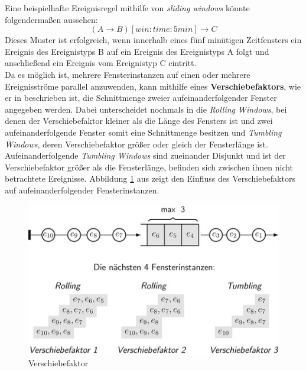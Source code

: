 \documentclass{acm_proc_article-sp}
\begin{document}
Eine beispielhafte Ereignisregel mithilfe von \textit{sliding windows} könnte 
folgendermaßen 
aussehen:
$$(A \rightarrow B)[win:time:5min] \rightarrow C$$
Dieses Muster ist erfolgreich, wenn innerhalb eines fünf minütigen Zeitfensters ein 
Ereignis des Ereignistyps B auf ein Ereignis des Ereignistyps A folgt und anschließend 
ein Ereignis vom Ereignistyp C eintritt.\\
Da es möglich ist, mehrere Fensterinstanzen auf einen oder mehrere Ereignisströme 
parallel 
anzuwenden, kann mithilfe eines \textbf{Verschiebefaktors}\label{kap:verschiebefaktor}, 
wie er in \cite{hedtstuck} beschrieben 
ist, die Schnittmenge zweier aufeinanderfolgender Fenster angegeben werden. Dabei 
unterscheidet \cite{hedtstuck} nochmals in die \textit{Rolling Windows}, bei denen der 
Verschiebefaktor kleiner als die Länge des Fensters ist und zwei aufeinanderfolgende 
Fenster somit eine Schnittmenge besitzen und \textit{Tumbling Windows}, deren 
Verschiebefaktor größer oder gleich der Fensterlänge ist. Aufeinanderfolgende 
\textit{Tumbling Windows} sind zueinander Disjunkt und ist der Verschiebefaktor größer 
als die Fensterlänge, befinden sich zwischen ihnen nicht betrachtete Ereignisse. 
Abbildung \ref{img:factors} aus \cite{hedtstuck} zeigt den Einfluss des 
Verschiebefaktors auf aufeinanderfolgender Fensterinstanzen.

\begin{figure}[H]
    \centering
    \includegraphics[width=\linewidth]{img/factor-hedstuck}
    \caption{Verschiebefaktor}
    \label{img:factors}
\end{figure}
\end{document}
